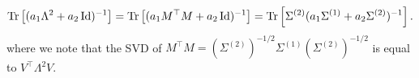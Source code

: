 \[ \operatorname{Tr}\left[(a_1 \Lambda^2 + a_2\operatorname{Id})^{-1}\right] = \operatorname{Tr}\left[(a_1 M^{\top}M + a_2 \operatorname{Id})^{-1}\right] = \operatorname{Tr}\left[\Sigma^{(2)} (a_1 \Sigma^{(1)} + a_2 \Sigma^{(2)})^{-1}\right]. \]
where we note that the SVD of $M^\top M = (\Sigma^{(2)})^{-1/2} \Sigma^{(1)} (\Sigma^{(2)})^{-1/2}$ is equal to $V^{\top}\Lambda^2 V$.

